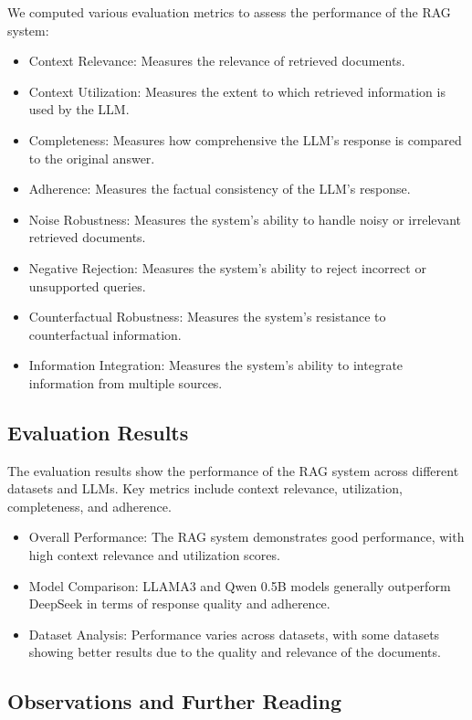 \documentclass{article}
\begin{document}
We computed various evaluation metrics to assess the performance of the RAG system:
\begin{itemize}
    \item Context Relevance: Measures the relevance of retrieved documents.
    \item Context Utilization: Measures the extent to which retrieved information is used by the LLM.
    \item Completeness: Measures how comprehensive the LLM's response is compared to the original answer.
    \item Adherence: Measures the factual consistency of the LLM's response.
    \item Noise Robustness: Measures the system's ability to handle noisy or irrelevant retrieved documents.
    \item Negative Rejection: Measures the system's ability to reject incorrect or unsupported queries.
    \item Counterfactual Robustness: Measures the system's resistance to counterfactual information.
    \item Information Integration: Measures the system's ability to integrate information from multiple sources.
\end{itemize}

\subsection{Evaluation Results}

The evaluation results show the performance of the RAG system across different datasets and LLMs. Key metrics include context relevance, utilization, completeness, and adherence.
\begin{itemize}
    \item Overall Performance: The RAG system demonstrates good performance, with high context relevance and utilization scores.
    \item Model Comparison: LLAMA3 and Qwen 0.5B models generally outperform DeepSeek in terms of response quality and adherence.
    \item Dataset Analysis: Performance varies across datasets, with some datasets showing better results due to the quality and relevance of the documents.
\end{itemize}

\subsection{Observations and Further Reading}
\end{document}
